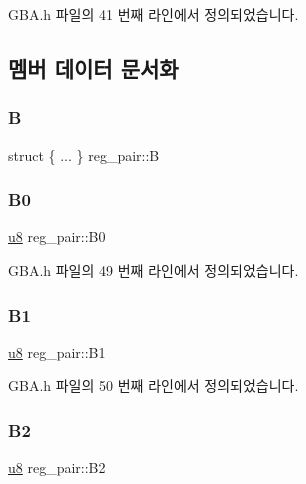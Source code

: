 G\+B\+A.\+h 파일의 41 번째 라인에서 정의되었습니다.



\subsection{멤버 데이터 문서화}
\mbox{\label{unionreg__pair_a4aa9f4a2c7db57ca409d6f6b1b9fad02}} 
\subsubsection{\texorpdfstring{B}{B}}
{\footnotesize\ttfamily struct \{ ... \}   reg\+\_\+pair\+::B}

\mbox{\label{unionreg__pair_a6dd2fb2300fcd64f13193c60a691193b}} 
\subsubsection{\texorpdfstring{B0}{B0}}
{\footnotesize\ttfamily \mbox{\hyperlink{_system_8h_aed742c436da53c1080638ce6ef7d13de}{u8}} reg\+\_\+pair\+::\+B0}



G\+B\+A.\+h 파일의 49 번째 라인에서 정의되었습니다.

\mbox{\label{unionreg__pair_a6ae44acc4062508a89704a00fcc8cdde}} 
\subsubsection{\texorpdfstring{B1}{B1}}
{\footnotesize\ttfamily \mbox{\hyperlink{_system_8h_aed742c436da53c1080638ce6ef7d13de}{u8}} reg\+\_\+pair\+::\+B1}



G\+B\+A.\+h 파일의 50 번째 라인에서 정의되었습니다.

\mbox{\label{unionreg__pair_a118393dbdd124530e8512699e730cb72}} 
\subsubsection{\texorpdfstring{B2}{B2}}
{\footnotesize\ttfamily \mbox{\hyperlink{_system_8h_aed742c436da53c1080638ce6ef7d13de}{u8}} reg\+\_\+pair\+::\+B2}



